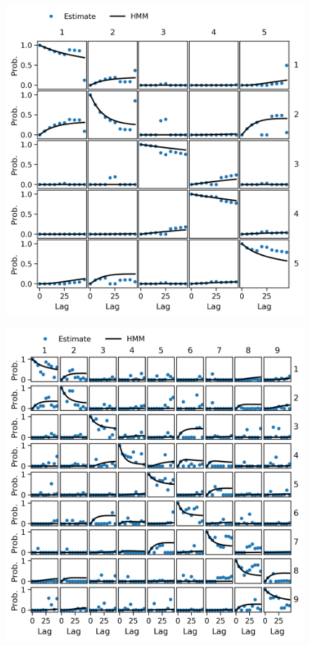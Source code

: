 \begin{figure}
    \centering
    \includegraphics{chapters/hmm_selection/figures/ck_test_5_5.png}
    
    \label{fig:prinz_ck_test_5_5}
\end{figure}

\begin{figure}
    \centering
    \includegraphics{chapters/hmm_selection/figures/ck_test_5_9.png}
    
    \label{fig:prinz_ck_test_5_9}
\end{figure}

